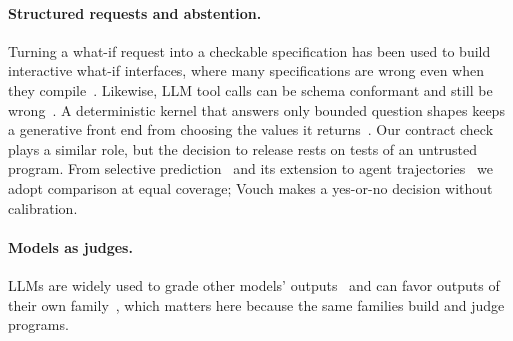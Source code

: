 \paragraph{Structured requests and abstention.} Turning a what-if request into a checkable specification has been used to build interactive what-if interfaces, where many specifications are wrong even when they compile~\cite{gathani2026praxa}. Likewise, LLM tool calls can be schema conformant and still be wrong~\cite{checkjson2026}. A deterministic kernel that answers only bounded question shapes keeps a generative front end from choosing the values it returns~\cite{wu2026never}. Our contract check plays a similar role, but the decision to release rests on tests of an untrusted program. From selective prediction~\cite{elyaniv2010selective,geifman2017selective} and its extension to agent trajectories~\cite{opoku2026toolchain} we adopt comparison at equal coverage; Vouch makes a yes-or-no decision without calibration.

\paragraph{Models as judges.} LLMs are widely used to grade other models' outputs~\cite{zheng2023judging} and can favor outputs of their own family~\cite{panickssery2024self}, which matters here because the same families build and judge programs.
